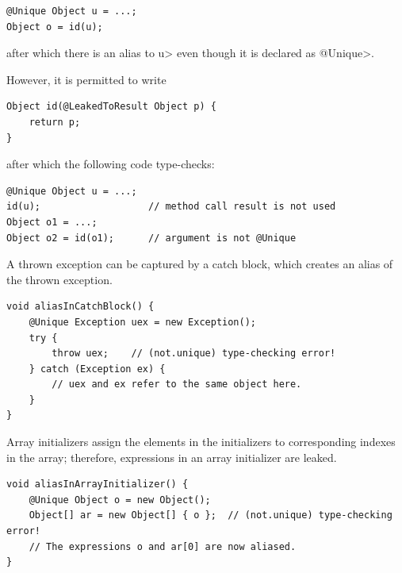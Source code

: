 \begin{description}
\begin{Verbatim}
@Unique Object u = ...;
Object o = id(u);
\end{Verbatim}

\noindent
after which there is an alias to \<u> even though it is declared as \<@Unique>.

However, it is permitted to write

\begin{Verbatim}
Object id(@LeakedToResult Object p) {
    return p;
}
\end{Verbatim}

\noindent
after which the following code type-checks:

\begin{Verbatim}
@Unique Object u = ...;
id(u);                   // method call result is not used
Object o1 = ...;
Object o2 = id(o1);      // argument is not @Unique
\end{Verbatim}



\item[Throws]
A thrown exception can be captured by a catch block, which creates an
alias of the thrown exception.

\begin{Verbatim}
void aliasInCatchBlock() {
    @Unique Exception uex = new Exception();
    try {
        throw uex;    // (not.unique) type-checking error!
    } catch (Exception ex) {
        // uex and ex refer to the same object here.
    }
}
\end{Verbatim}

\item[Array initializers]

Array initializers assign the elements in the initializers to corresponding
indexes in the array; therefore, expressions in an array initializer are leaked.

\begin{Verbatim}
void aliasInArrayInitializer() {
    @Unique Object o = new Object();
    Object[] ar = new Object[] { o };  // (not.unique) type-checking error!
    // The expressions o and ar[0] are now aliased.
}
\end{Verbatim}


\end{description}




